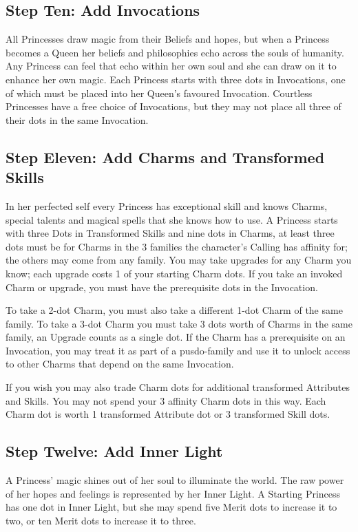 \subsection*{Step Ten: Add Invocations} 

All Princesses draw magic from their Beliefs and hopes, but when a Princess becomes a Queen her beliefs and philosophies echo across the souls of humanity. Any Princess can feel that echo within her own soul and she can draw on it to enhance her own magic. Each Princess starts with three dots in Invocations, one of which must be placed into her Queen's favoured Invocation. Courtless Princesses have a free choice of Invocations, but they may not place all three of their dots in the same Invocation. 

\subsection*{Step Eleven: Add Charms and Transformed Skills}

In her perfected self every Princess has exceptional skill and knows Charms, special talents and magical spells that she knows how to use. A Princess starts with three Dots in Transformed Skills and nine dots in Charms, at least three dots must be for Charms in the 3 families the character's Calling has affinity for; the others may come from any family. You may take upgrades for any Charm you know; each upgrade costs 1 of your starting Charm dots. If you take an invoked Charm or upgrade, you must have the prerequisite dots in the Invocation. 

To take a 2-dot Charm, you must also take a different 1-dot Charm of the same family. To take a 3-dot Charm you must take 3 dots worth of Charms in the same family, an Upgrade counts as a single dot. If the Charm has a prerequisite on an Invocation, you may treat it as part of a pusdo-family and use it to unlock access to other Charms that depend on the same Invocation. 

If you wish you may also trade Charm dots for additional transformed Attributes and Skills. You may not spend your 3 affinity Charm dots in this way. Each Charm dot is worth 1 transformed Attribute dot or 3 transformed Skill dots.


\subsection*{Step Twelve: Add Inner Light}

A Princess' magic shines out of her soul to illuminate the world. The raw power of her hopes and feelings is represented by her Inner Light. A Starting Princess has one dot in Inner Light, but she may spend five Merit dots to increase it to two, or ten Merit dots to increase it to three. 

